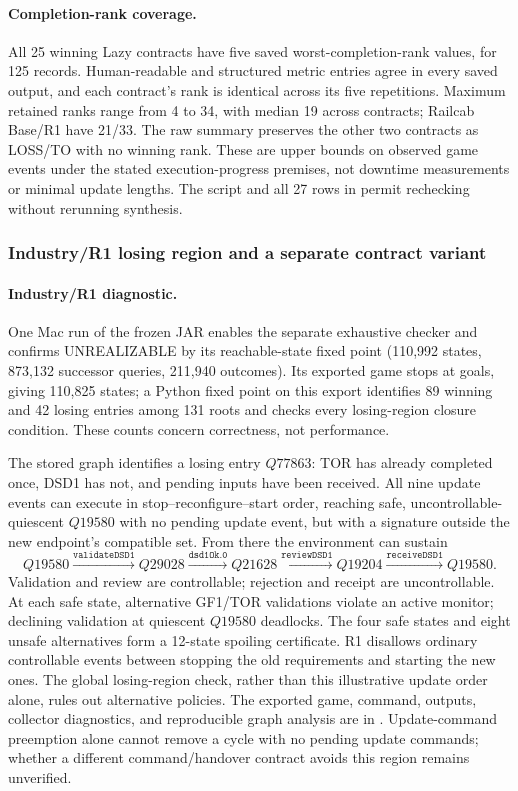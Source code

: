 \documentclass[11pt]{article}
\begin{document}
\paragraph{Completion-rank coverage.}
All 25 winning Lazy contracts have five saved worst-completion-rank values, for 125 records. Human-readable and structured metric entries agree in every saved output, and each contract's rank is identical across its five repetitions. Maximum retained ranks range from 4 to 34, with median 19 across contracts; Railcab Base/R1 have 21/33. The raw summary preserves the other two contracts as LOSS/TO with no winning rank. These are upper bounds on observed game events under the stated execution-progress premises, not downtime measurements or minimal update lengths. The script  and all 27 rows in  permit rechecking without rerunning synthesis.

\clearpage
\subsubsection{Industry/R1 losing region and a separate contract variant}
\label{supp:industry-diagnostic}
\paragraph{Industry/R1 diagnostic.}
One Mac run of the frozen JAR enables the separate exhaustive checker and confirms UNREALIZABLE by its reachable-state fixed point (110,992 states, 873,132 successor queries, 211,940 outcomes). Its exported game stops at goals, giving 110,825 states; a Python fixed point on this export identifies 89 winning and 42 losing entries among 131 roots and checks every losing-region closure condition. These counts concern correctness, not performance.

The stored graph identifies a losing entry $Q77863$: TOR has already completed once, DSD1 has not, and pending inputs have been received. All nine update events can execute in stop--reconfigure--start order, reaching safe, uncontrollable-quiescent $Q19580$ with no pending update event, but with a signature outside the new endpoint's compatible set. From there the environment can sustain
\[
Q19580\xrightarrow{\texttt{validateDSD1}}Q29028
\xrightarrow{\texttt{dsd1Ok.0}}Q21628
\xrightarrow{\texttt{reviewDSD1}}Q19204
\xrightarrow{\texttt{receiveDSD1}}Q19580.
\]
Validation and review are controllable; rejection and receipt are uncontrollable. At each safe state, alternative GF1/TOR validations violate an active monitor; declining validation at quiescent $Q19580$ deadlocks. The four safe states and eight unsafe alternatives form a 12-state spoiling certificate. R1 disallows ordinary controllable events between stopping the old requirements and starting the new ones. The global losing-region check, rather than this illustrative update order alone, rules out alternative policies. The exported game, command, outputs, collector diagnostics, and reproducible graph analysis are in . Update-command preemption alone cannot remove a cycle with no pending update commands; whether a different command/handover contract avoids this region remains unverified.
\end{document}
